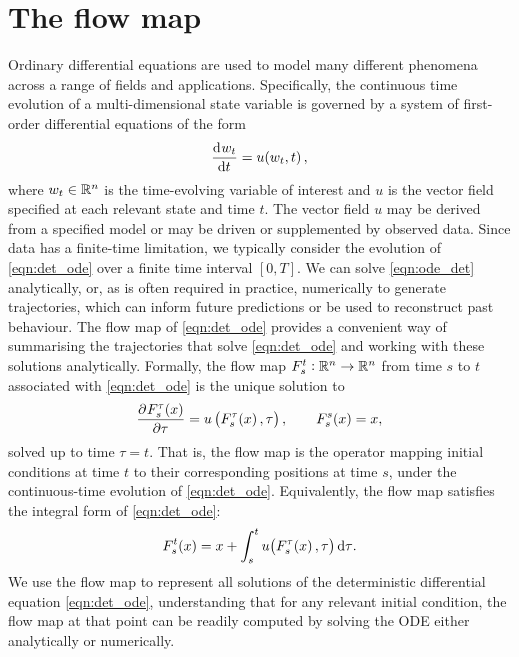 \section{The flow map}
Ordinary differential equations are used to model many different phenomena across a range of fields and applications.
Specifically, the continuous time evolution of a multi-dimensional state variable is governed by a system of first-order differential equations of the form
\begin{equation}\label{eqn:det_ode}
	\dod{w_t}{t} = u\!\left(w_t, t\right),
\end{equation}
where \(w_t \in \mathbb{R}^n\) is the time-evolving variable of interest and \(u\) is the vector field specified at each relevant state and time \(t\).
The vector field \(u\) may be derived from a specified model or may be driven or supplemented by observed data.
Since data has a finite-time limitation, we typically consider the evolution of \cref{eqn:det_ode} over a finite time interval \([0,T]\).
We can solve \cref{eqn:ode_det} analytically, or, as is often required in practice, numerically to generate trajectories, which can inform future predictions or be used to reconstruct past behaviour.
The flow map of \cref{eqn:det_ode} provides a convenient way of summarising the trajectories that solve \cref{eqn:det_ode} and working with these solutions analytically.
Formally, the flow map \(F_{s}^{t}: \mathbb{R}^n \to \mathbb{R}^n\) from time \(s\) to \(t\) associated with \cref{eqn:det_ode} is the unique solution to
\begin{equation}
	\dpd{F_{s}^{\tau}\!\left(x\right)}{\tau} = u\left(F_{s}^\tau\!\left(x\right), \tau\right), \qquad F_{s}^{s}\!\left(x\right) = x,
	\label{eqn:flow_map_ode}
\end{equation}
solved up to time \(\tau = t\).
That is, the flow map is the operator mapping initial conditions at time \(t\) to their corresponding positions at time \(s\), under the continuous-time evolution of \cref{eqn:det_ode}.
Equivalently, the flow map satisfies the integral form of \cref{eqn:det_ode}:
\begin{equation*}
	F_s^t\!\left(x\right) = x + \int_s^t{u\!\left(F_s^{\tau}\!\left(x\right), \tau\right)\dif \tau}.
\end{equation*}
We use the flow map to represent all solutions of the deterministic differential equation \cref{eqn:det_ode}, understanding that for any relevant initial condition, the flow map at that point can be readily computed by solving the ODE either analytically or numerically.
